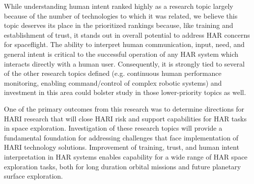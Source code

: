 While understanding human intent ranked highly as a research topic largely because of the number of technologies to which it was related, we believe this topic deserves its place in the prioritized rankings because, like training and establishment of trust, it stands out in overall potential to address HAR concerns for spaceflight. The ability to interpret human communication, input, need, and general intent is critical to the successful operation of any HAR system which interacts directly with a human user. Consequently, it is strongly tied to several of the other research topics defined (e.g. continuous human performance monitoring, enabling command/control of complex robotic systems) and investment in this area could bolster study in those lower-priority topics as well.

One of the primary outcomes from this research was to determine directions for HARI research that will close HARI risk and support capabilities for HAR tasks in space exploration. Investigation of these research topics will provide a fundamental foundation for addressing challenges that face implementation of HARI technology solutions. Improvement of training, trust, and human intent interpretation in HAR systems enables capability for a wide range of HAR space exploration tasks, both for long duration orbital missions and future planetary surface exploration.

